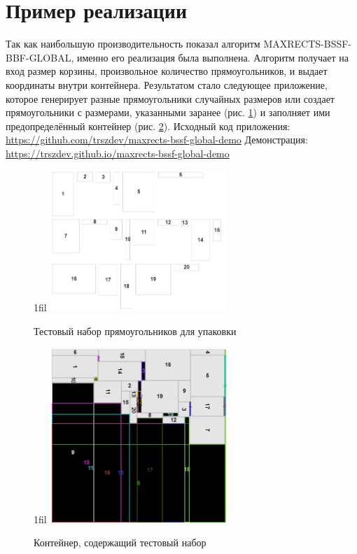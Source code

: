 \documentclass[a4paper,12pt]{report}
\makeatletter
\theoremstyle{remark}
\newcommand*{\centerfloat}{%
  \parindent \z@
  \leftskip \z@ \@plus 1fil \@minus \textwidth
  \rightskip\leftskip
  \parfillskip \z@skip}
\makeatother
\begin{document}
\section{Пример реализации}

Так как наибольшую производительность показал алгоритм MAXRECTS-BSSF-BBF-GLOBAL, именно его реализация была выполнена. Алгоритм получает на вход размер корзины, произвольное количество прямоугольников, и выдает координаты внутри контейнера. Результатом стало следующее приложение, которое генерирует разные прямоугольники случайных размеров или создает прямоугольники с размерами, указанными заранее (рис. \ref{fig:maxrects-impl}) и заполняет ими предопределённый контейнер (рис. \ref{fig:maxrects-impl2}).
\newline
\newline
Исходный код приложения: \url{https://github.com/trszdev/maxrects-bssf-global-demo}
\newline
Демонстрация: \url{https://trszdev.github.io/maxrects-bssf-global-demo}

\begin{figure}
    \centerfloat
    \includegraphics[width=0.6\textwidth]{packing/5.jpg}
    \caption{Тестовый набор прямоугольников для упаковки}
    \label{fig:maxrects-impl}
\end{figure}

\begin{figure}
    \centerfloat
    \includegraphics[width=0.6\textwidth]{packing/6.jpg}
    \caption{Контейнер, содержащий тестовый набор}
    \label{fig:maxrects-impl2}
\end{figure}
\end{document}
